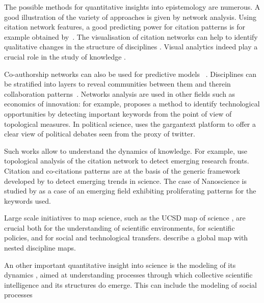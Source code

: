 The possible methods for quantitative insights into epistemology are numerous. A good illustration of the variety of approaches is given by network analysis. Using citation network features, a good predicting power for citation patterns is for example obtained by~\cite{2013arXiv1310.8220N}. The visualisation of citation networks can help to identify qualitative changes in the structure of disciplines \citep{chen2004searching}. Visual analytics indeed play a crucial role in the study of knowledge \citep{borner2003visualizing}.

Co-authorship networks can also be used for predictive models ~\citep{2014arXiv1402.7268S}. Disciplines can be stratified into layers to reveal communities between them and therein collaboration patterns~\citep{2015arXiv150601280B}. Networks analysis are used in other fields such as economics of innovation: for example, \cite{choi2014patent} proposes a method to identify technological opportunities by detecting important keywords from the point of view of topological measures. In political science, \cite{gaumont2017methods} uses the gargantext platform to offer a clear view of political debates seen from the proxy of twitter.

Such works allow to understand the dynamics of knowledge. For example, \cite{shibata2008detecting} use topological analysis of the citation network to detect emerging research fronts. Citation and co-citations patterns are at the basis of the generic framework developed by \cite{chen2006citespace} to detect emerging trends in science. The case of Nanoscience is studied by \cite{bonaccorsi2010proliferation} as a case of an emerging field exhibiting proliferating patterns for the keywords used.

Large scale initiatives to map science, such as the UCSD map of science \citep{borner2012design}, are crucial both for the understanding of scientific environments, for scientific policies, and for social and technological transfers. \cite{leydesdorff2009global} describe a global map with nested discipline maps.

An other important quantitative insight into science is the modeling of its dynamics \citep{borner2011modeling,scharnhorst2012models}, aimed at understanding processes through which collective scientific intelligence and its structures do emerge. This can include the modeling of social processes \citep{edmonds2011simulating}


